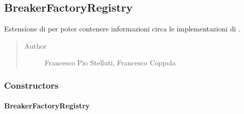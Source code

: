 \documentclass[letterpaper,10pt,italian,openany,oneside]{sphinxmanual}
\begin{document}
\subsection{BreakerFactoryRegistry}
\label{\detokenize{source/it/unicam/cs/pa/mastermind/factories/BreakerFactoryRegistry:breakerfactoryregistry}}\label{\detokenize{source/it/unicam/cs/pa/mastermind/factories/BreakerFactoryRegistry::doc}}

\begin{fulllineitems}
\label{\detokenize{source/it/unicam/cs/pa/mastermind/factories/BreakerFactoryRegistry:it.unicam.cs.pa.mastermind.factories.BreakerFactoryRegistry}}
Estensione di  per poter contenere informazioni circa le implementazioni di .
\begin{quote}\begin{description}
\item[{Author}] \leavevmode
Francesco Pio Stelluti, Francesco Coppola

\end{description}\end{quote}

\end{fulllineitems}



\subsubsection{Constructors}
\label{\detokenize{source/it/unicam/cs/pa/mastermind/factories/BreakerFactoryRegistry:constructors}}

\paragraph{BreakerFactoryRegistry}
\label{\detokenize{source/it/unicam/cs/pa/mastermind/factories/BreakerFactoryRegistry:id1}}
\end{document}
